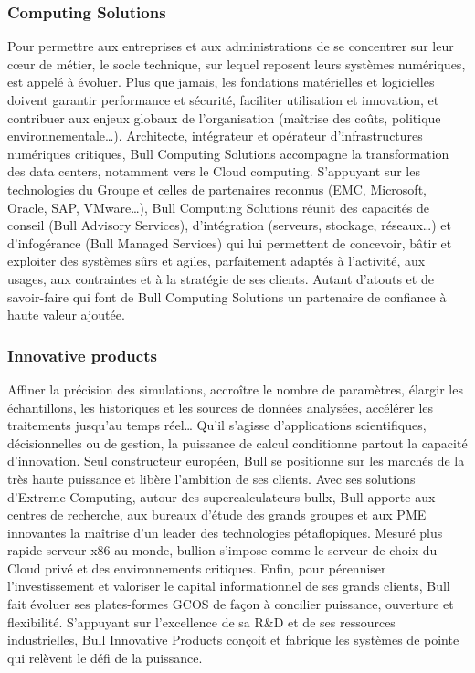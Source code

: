 \documentclass[11pt]{article}
\begin{document}
		\subsubsection{Computing Solutions}
		Pour permettre aux entreprises et aux administrations de se concentrer sur leur cœur de métier, le socle technique, 
		sur lequel reposent leurs systèmes numériques, est appelé à évoluer. Plus que jamais, les fondations matérielles et 
		logicielles doivent garantir performance et sécurité, faciliter utilisation et innovation, et contribuer aux enjeux 
		globaux de l’organisation (maîtrise des coûts, politique environnementale…). Architecte, intégrateur et opérateur 
		d’infrastructures numériques critiques, Bull Computing Solutions accompagne la transformation des data centers, 
		notamment vers le Cloud computing. S’appuyant sur les technologies du Groupe et celles de partenaires reconnus 
		(EMC, Microsoft, Oracle, SAP, VMware…), Bull Computing Solutions réunit des capacités de conseil (Bull Advisory 
		Services), d’intégration (serveurs, stockage, réseaux…) et d’infogérance (Bull Managed Services) qui lui permettent 
		de concevoir, bâtir et exploiter des systèmes sûrs et agiles, parfaitement adaptés à l’activité, aux usages, aux 
		contraintes et à la stratégie de ses clients. Autant d’atouts et de savoir-faire qui font de Bull Computing Solutions 
		un partenaire de confiance à haute valeur ajoutée.
		\subsubsection{Innovative products}
		Affiner la précision des simulations, accroître le nombre de paramètres, élargir les échantillons, les historiques et 
		les sources de données analysées, accélérer les traitements jusqu’au temps réel… Qu’il s’agisse d’applications 
		scientifiques, décisionnelles ou de gestion, la puissance de calcul conditionne partout la capacité d’innovation. 
		Seul constructeur européen, Bull se positionne sur les marchés de la très haute puissance et libère l’ambition de ses 
		clients. Avec ses solutions d’Extreme Computing, autour des supercalculateurs bullx, Bull apporte aux centres de 
		recherche, aux bureaux d’étude des grands groupes et aux PME innovantes la maîtrise d’un leader des technologies 
		pétaflopiques. Mesuré plus rapide serveur x86 au monde, bullion s’impose comme le serveur de choix du Cloud privé et 
		des environnements critiques. Enfin, pour pérenniser l’investissement et valoriser le capital informationnel de ses 
		grands clients, Bull fait évoluer ses plates-formes GCOS de façon à concilier puissance, ouverture et flexibilité. 
		S’appuyant sur l’excellence de sa R\&D et de ses ressources industrielles, Bull Innovative Products conçoit et 
		fabrique les systèmes de pointe qui relèvent le défi de la puissance.
\end{document}
